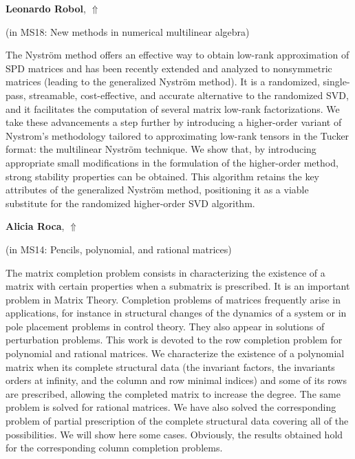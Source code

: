 \documentclass[ILAS2025-program.tex]{subfiles}
\begin{document}
\hypertarget{down0037}{}\begin{ilasabstract}
    
\textbf{Leonardo Robol},  \hfill \hyperlink{up0037}{$\Uparrow$}
    
    
(in {\color{mstitle}MS18: New methods in numerical multilinear algebra})
        
\mtskip
    The Nystr\"om method offers an effective way to obtain low-rank approximation of SPD matrices and has been recently extended and analyzed to nonsymmetric matrices (leading to the generalized Nystr\"om method). It is a randomized, single-pass, streamable, cost-effective, and accurate alternative to the randomized SVD, and it facilitates the computation of several matrix low-rank factorizations. We take these advancements a step further by introducing a higher-order variant of Nystrom’s methodology tailored to approximating low-rank tensors in the Tucker format: the multilinear Nystr\"om technique. We show that, by introducing appropriate small modifications in the formulation of the higher-order method, strong stability properties can be obtained. This algorithm retains the key attributes of the generalized Nystr\"om method, positioning it as a viable substitute for the randomized higher-order SVD algorithm.
\end{ilasabstract}
    

\hypertarget{down0374}{}\begin{ilasabstract}
    
\textbf{Alicia Roca},  \hfill \hyperlink{up0374}{$\Uparrow$}
    
    
(in {\color{mstitle}MS14: Pencils, polynomial, and rational matrices})
        
\mtskip
    The matrix completion problem consists in characterizing the existence of a matrix with certain properties when a submatrix is prescribed.  It is an important problem in Matrix Theory.
Completion problems of matrices frequently arise in applications, for instance in structural changes of the dynamics of a system or in pole placement problems in control  theory. They also appear in solutions of perturbation problems. 
This work is devoted to the row completion problem for polynomial and rational matrices. 
We characterize the existence of a polynomial matrix when its complete structural data  (the invariant factors, the invariants orders at infinity, and the column and row minimal indices) and some of its rows are prescribed, allowing the completed matrix to increase the degree.
The same problem is solved for rational matrices.
We have also  solved the corresponding problem of partial prescription of the complete structural data covering  all of the possibilities. We will show here some cases.
Obviously, the results obtained hold for the corresponding column  completion problems.



\end{ilasabstract}
    
\end{document}
